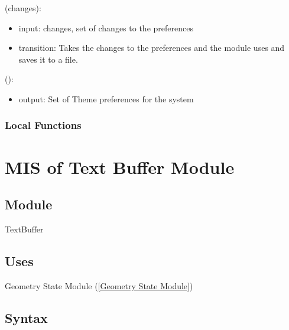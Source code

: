 \documentclass[12pt, titlepage]{article}
\begin{document}
(changes):
\begin{itemize}
\item input: changes, set of changes to the preferences
\item transition: Takes the changes to the preferences and the module uses and saves it to a file.
\end{itemize}

():
\begin{itemize}
\item output: Set of Theme preferences for the system
\end{itemize}

%

\subsubsection{Local Functions}


\newpage
\section{MIS of {Text Buffer Module}} \label{Text Buffer Module}
%
%

\subsection{Module}
TextBuffer

\subsection{Uses}
Geometry State Module (\ref{Geometry State Module})

\subsection{Syntax}
\end{document}
